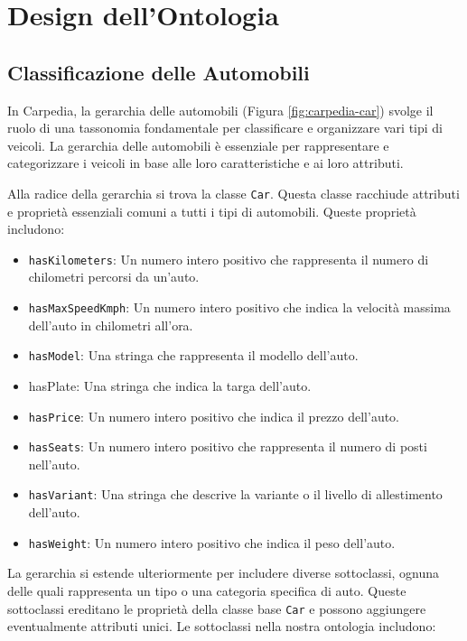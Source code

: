 \chapter{Design dell'Ontologia}

\section{Classificazione delle Automobili}

In Carpedia, la gerarchia delle automobili (Figura \ref{fig:carpedia-car}) svolge il ruolo di una tassonomia fondamentale per classificare e organizzare vari tipi di veicoli. La gerarchia delle automobili è essenziale per rappresentare e categorizzare i veicoli in base alle loro caratteristiche e ai loro attributi.

Alla radice della gerarchia si trova la classe \texttt{Car}. Questa classe racchiude attributi e proprietà essenziali comuni a tutti i tipi di automobili. Queste proprietà includono:

\begin{itemize}
    \item \texttt{hasKilometers}: Un numero intero positivo che rappresenta il numero di chilometri percorsi da un'auto.
    \item \texttt{hasMaxSpeedKmph}: Un numero intero positivo che indica la velocità massima dell'auto in chilometri all'ora.
    \item \texttt{hasModel}: Una stringa che rappresenta il modello dell'auto.
    \item hasPlate: Una stringa che indica la targa dell'auto.
    \item \texttt{hasPrice}: Un numero intero positivo che indica il prezzo dell'auto.
    \item \texttt{hasSeats}: Un numero intero positivo che rappresenta il numero di posti nell'auto.
    \item \texttt{hasVariant}: Una stringa che descrive la variante o il livello di allestimento dell'auto.
    \item \texttt{hasWeight}: Un numero intero positivo che indica il peso dell'auto.
\end{itemize}

La gerarchia si estende ulteriormente per includere diverse sottoclassi, ognuna delle quali rappresenta un tipo o una categoria specifica di auto. Queste sottoclassi ereditano le proprietà della classe base \texttt{Car} e possono aggiungere eventualmente attributi unici. Le sottoclassi nella nostra ontologia includono:

